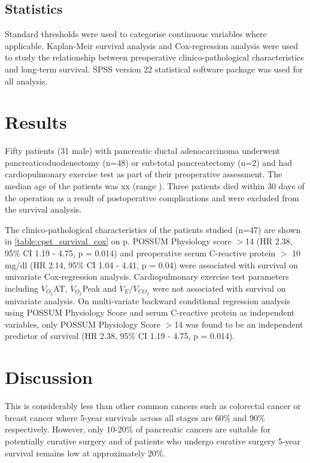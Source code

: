 \subsection{Statistics}
Standard thresholds were used to categorise continuous variables where applicable. Kaplan-Meir survival analysis and Cox-regression analysis were used to study the relationship between preoperative clinico-pathological characteristics and long-term survival. SPSS version 22 statistical software package was used for all analysis.



\section{Results}



Fifty patients (31 male) with pancreatic ductal adenocarcinoma underwent pancreaticoduodenectomy (n=48) or sub-total pancreatectomy (n=2) and had cardiopulmonary exercise test as part of their preoperative assessment. The median age of the patients was xx (range ). Three patients died within 30 days of the operation as a result of postoperative complications and were excluded from the survival analysis.

The clinico-pathological characteristics of the patients studied (n=47) are shown in \ref{table:cpet_survival_cox} on p\pageref{table:cpet_survival_cox}. POSSUM Physiology score $>$14 (HR 2.38, 95\% CI 1.19 - 4.75, p = 0.014) and preoperative serum C-reactive protein $>$ 10 mg/dl (HR 2.14, 95\% CI 1.04 - 4.41, p = 0.04) were associated with survival on univariate Cox-regression analysis. Cardiopulmonary exercise test parameters including $\dot{V}_{O_2}$AT, $\dot{V}_{O_2}$Peak and $\dot{V}_E/\dot{V}_{CO_2}$ were not associated with survival on univariate analysis.
On multi-variate backward conditional regression analysis using POSSUM Physiology Score and serum C-reactive protein as independent variables, only POSSUM Physiology Score $>$14  was found to be an independent predictor of survival (HR 2.38, 95\% CI 1.19 - 4.75, p = 0.014).










\section{Discussion}

 This is considerably less than other common cancers such as colorectal cancer or breast cancer where 5-year survivals across all stages are 60\% and 90\% respectively. However, only 10-20\% of pancreatic cancers are suitable for potentially curative surgery and of patients who undergo curative surgery 5-year survival remains low at approximately 20\%.\parencite{cancerresearchuk_cancer_2014}